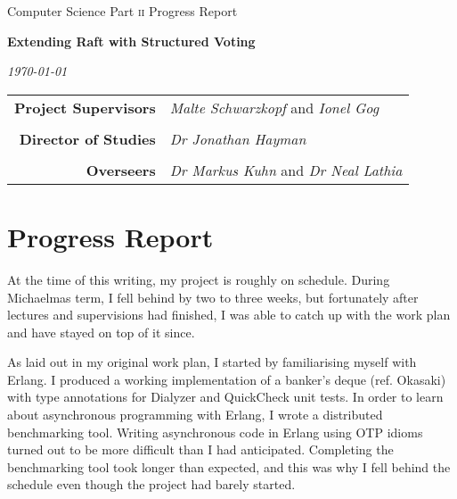 \documentclass[11pt]{scrartcl}
\begin{document}
\thispagestyle{empty}

 \medskip
{} \medskip
{}

\vfil

\centerline{\large Computer Science Part \textsc{ii} Progress Report} \vspace{0.4in}
\centerline{\Large\bf Extending Raft with Structured Voting} \vspace{0.3in}
\centerline{\large\it \today}

\vfil

\begin{center}
\begin{tabularx}{316pt}{rX}
\textbf{Project Supervisors} & \textit{Malte Schwarzkopf} and \textit{Ionel Gog} \\ \\
\textbf{Director of Studies} & \textit{Dr Jonathan Hayman} \\ \\
\textbf{Overseers} & \textit{Dr Markus Kuhn} and \textit{Dr Neal Lathia}
\end{tabularx}
\end{center}

\newpage

\section{Progress Report%
  \label{progress-report}%
}

At the time of this writing, my project is roughly on schedule. During Michaelmas term, I fell behind by two to three weeks, but fortunately after lectures and supervisions had finished, I was able to catch up with the work plan and have stayed on top of it since.

As laid out in my original work plan, I started by familiarising myself with Erlang. I produced a working implementation of a banker's deque (ref. Okasaki) with type annotations for Dialyzer and QuickCheck unit tests. In order to learn about asynchronous programming with Erlang, I wrote a distributed benchmarking tool. Writing asynchronous code in Erlang using OTP idioms turned out to be more difficult than I had anticipated. Completing the benchmarking tool took longer than expected, and this was why I fell behind the schedule even though the project had barely started.
\end{document}
